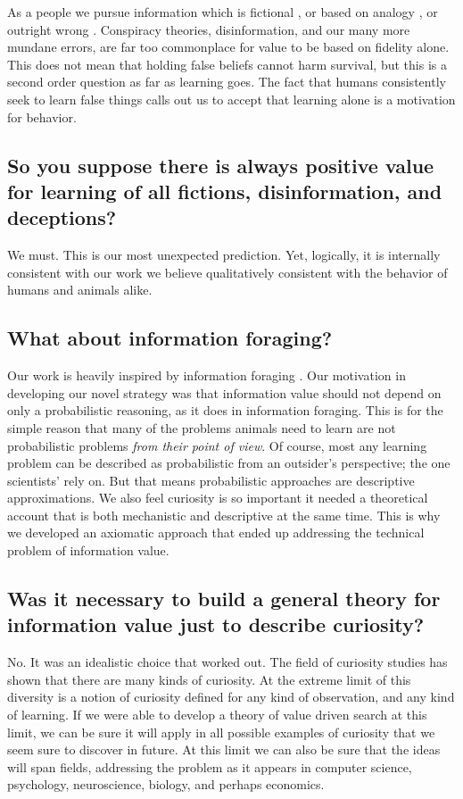 As a people we pursue information which is fictional \citep{sternisko2020dark}, or based on analogy \citep{gentner1997reasoning}, or outright wrong \citep{loftus1989misinformation}. Conspiracy theories, disinformation, and our many more mundane errors, are far too commonplace for value to be based on fidelity alone. This does not mean that holding false beliefs cannot harm survival, but this is a second order question as far as learning goes. The fact that humans consistently seek to learn false things calls out us to accept that learning alone is a motivation for behavior.


\subsection*{So you suppose there is always positive value for learning of all fictions, disinformation, and deceptions?}
We must. This is our most unexpected prediction. Yet, logically, it is internally consistent with our work we believe qualitatively consistent with the behavior of humans and animals alike.


\subsection*{What about information foraging?}
Our work is heavily inspired by information foraging \citep{Inglis2001,Reddy2016}. Our motivation in developing our novel strategy was that information value should not depend on only a probabilistic reasoning, as it does in information foraging. This is for the simple reason that many of the problems animals need to learn are not probabilistic problems \textit{from their point of view}. Of course, most any learning problem can be described as probabilistic from an outsider's perspective; the one scientists' rely on. But that means probabilistic approaches are descriptive approximations. We also feel curiosity is so important it needed a theoretical account that is both mechanistic and descriptive at the same time. This is why we developed an axiomatic approach that ended up addressing the technical problem of information value.


\subsection*{Was it necessary to build a general theory for information value just to describe curiosity?}
No. It was an idealistic choice that worked out. The field of curiosity studies has shown that there are many kinds of curiosity. At the extreme limit of this diversity is a notion of curiosity defined for any kind of observation, and any kind of learning. If we were able to develop a theory of value driven search at this limit, we can be sure it will apply in all possible examples of curiosity that we seem sure to discover in future. At this limit we can also be sure that the ideas will span fields, addressing the problem as it appears in computer science, psychology, neuroscience, biology, and perhaps economics.


